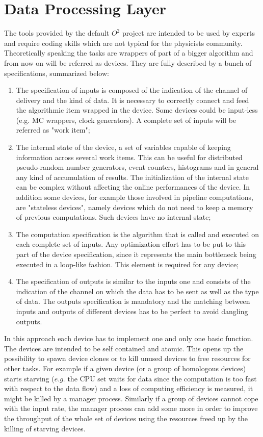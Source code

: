 \section{Data Processing Layer}
The tools provided by the default $O^2$ project are intended to be used by experts and require coding skills which are not typical for the physicists community.
Theoretically speaking the tasks are wrappers of part of a bigger algorithm and from now on will be referred as devices.
They are fully described by a bunch of specifications, summarized below:
\begin{enumerate}
    \item The specification of inputs is composed of the indication of the channel of delivery and the kind of data. It is necessary to correctly connect and feed the algorithmic item wrapped in the device. Some devices could be input-less (e.g. MC wrappers, clock generators). A complete set of inputs will be referred as "work item";
    \item The internal state of the device, a set of variables capable of keeping information across several work items. This can be useful for distributed pseudo-random number generators, event counters, histograms and in general any kind of accumulation of results. The initialization of the internal state can be complex without affecting the online performances of the device. In addition some devices, for example those involved in pipeline computations, are "stateless devices", namely devices which do not need to keep a memory of previous computations. Such devices have no internal state;
    \item The computation specification is the algorithm that is called and executed on each complete set of inputs. Any optimization effort has to be put to this part of the device specification, since it represents the main bottleneck being executed in a loop-like fashion. This element is required for any device;
    \item The specification of outputs is similar to the inputs one and consists of the indication of the channel on which the data has to be sent as well as the type of data. The outputs specification is mandatory and the matching between inputs and outputs of different devices has to be perfect to avoid dangling outputs.
\end{enumerate}

In this approach each device has to implement one and only one basic function.
The devices are intended to be self contained and atomic.
This opens up the possibility to spawn device clones or to kill unused devices to free resources for other tasks.
For example if a given device (or a group of homologous devices) starts starving ($e.g.$ the CPU set waits for data since the computation is too fast with respect to the data flow) and a loss of computing efficiency is measured, it might be killed by a manager process.
Similarly if a group of devices cannot cope with the input rate, the manager process can add some more in order to improve the throughput of the whole set of devices using the resources freed up by the killing of starving devices.

